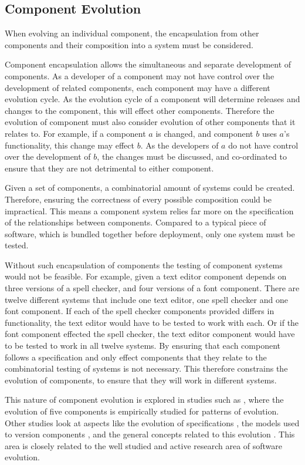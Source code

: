 \subsection{Component Evolution}
When evolving an individual component, the encapsulation from other components and their composition into a system must be considered.

Component encapsulation allows the simultaneous and separate development of components.
As a developer of a component may not have control over the development of related components, each component may have a different evolution cycle.
As the evolution cycle of a component will determine releases and changes to the component, this will effect other components.
Therefore the evolution of component must also consider evolution of other components that it relates to.
For example, if a component $a$ is changed, and component $b$ uses $a$'s functionality, this change may effect $b$.
As the developers of $a$ do not have control over the development of $b$, the changes must be discussed, and co-ordinated to ensure that they are not detrimental to either component.

Given a set of components, a combinatorial amount of systems could be created.
Therefore, ensuring the correctness of every possible composition could be impractical.
This means a component system relies far more on the specification of the relationships between components.
Compared to a typical piece of software, which is bundled together before deployment, only one system must be tested.

Without such encapsulation of components the testing of component systems would not be feasible.
For example, given a text editor component depends on three versions of a spell checker, 
and four versions of a font component.
There are twelve different systems that include one text editor, one spell checker and one font component.
If each of the spell checker components provided differs in functionality, the text editor would have to be tested to work with each.
Or if the font component effected the spell checker, the text editor component would have to be tested to work in all twelve systems.
By ensuring that each component follows a specification and only effect components that they relate to the combinatorial testing of systems is not necessary.
This therefore constrains the evolution of components, to ensure that they will work in different systems.

This nature of component evolution is explored in studies such as \citep{vasa2007patterns}, 
where the evolution of five components is empirically studied for patterns of evolution.
Other studies look at aspects like the evolution of specifications \citep{Mencl2001}, the models used to version components \citep{Stuckenholz2005},
and the general concepts related to this evolution \citep{Rhode2000}.
This area is closely related to the well studied and active research area of software evolution.


